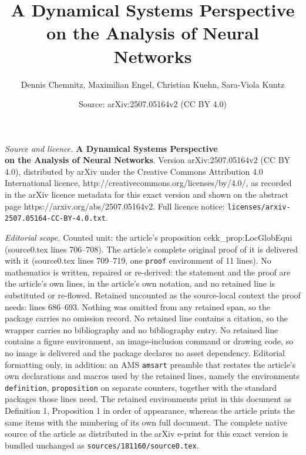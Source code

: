 \documentclass[10pt,a4paper]{amsart}
\title{\textbf{A Dynamical Systems Perspective \\ on the Analysis of Neural Networks}}
\author{Dennis Chemnitz, Maximilian Engel, Christian Kuehn, Sara-Viola Kuntz}
\date{Source: arXiv:2507.05164v2 (CC BY 4.0)}
\begin{document}
\maketitle

\noindent\emph{Source and licence.} \textbf{A Dynamical Systems Perspective \\ on the Analysis of Neural Networks}. Version arXiv:2507.05164v2 (CC BY 4.0), distributed by arXiv under the Creative Commons Attribution 4.0 International licence, http://creativecommons.org/licenses/by/4.0/, as recorded in the arXiv licence metadata for this exact version and shown on the abstract page https://arxiv.org/abs/2507.05164v2. Full licence notice: \texttt{licenses/arxiv-2507.05164-CC-BY-4.0.txt}.\par\smallskip

\noindent\textit{Editorial scope.} Counted unit: the article's proposition cekk\_prop:LocGlobEqui (source0.tex lines 706--708). The article's complete original proof of it is delivered with it (source0.tex lines 709--719, one \texttt{proof} environment of 11 lines). No mathematics is written, repaired or re-derived: the statement and the proof are the article's own lines, in the article's own notation, and no retained line is substituted or re-flowed.  Retained uncounted as the source-local context the proof needs: lines 686--693.  Nothing was omitted from any retained span, so the package carries no omission record.  No retained line contains a citation, so the wrapper carries no bibliography and no bibliography entry.  No retained line contains a figure environment, an image-inclusion command or drawing code, so no image is delivered and the package declares no asset dependency.  Editorial formatting only, in addition: an AMS \texttt{amsart} preamble that restates the article's own declarations and macros used by the retained lines, namely the environments \texttt{definition}, \texttt{proposition} on separate counters, together with the standard packages those lines need.  The retained environments print in this document as Definition 1, Proposition 1 in order of appearance, whereas the article prints the same items with the numbering of its own full document.  The complete native source of the article as distributed in the arXiv e-print for this exact version is bundled unchanged as \texttt{sources/181160/source0.tex}.
\end{document}
